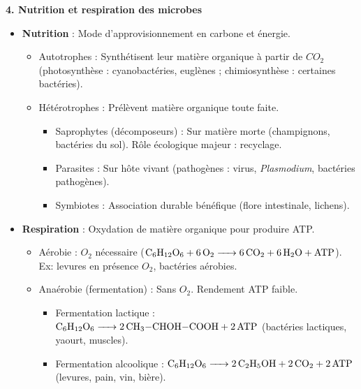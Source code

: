 \documentclass[11pt]{article}
\newcommand{\cle}[1]{{\popxbold\color{popdark}#1}}
\begin{document}
\begin{bilan}
\textbf{4. Nutrition et respiration des microbes}
\begin{itemize}
    \item \textbf{Nutrition} : Mode d'approvisionnement en carbone et énergie.
    \begin{itemize}
        \item \cle{Autotrophes} : Synthétisent leur matière organique à partir de $CO_2$ (photosynthèse : cyanobactéries, euglènes ; chimiosynthèse : certaines bactéries).
        \item \cle{Hétérotrophes} : Prélèvent matière organique toute faite.
        \begin{itemize}
            \item \cle{Saprophytes} (décomposeurs) : Sur matière morte (champignons, bactéries du sol). Rôle écologique majeur : recyclage.
            \item \cle{Parasites} : Sur hôte vivant (pathogènes : virus, \emph{Plasmodium}, bactéries pathogènes).
            \item \cle{Symbiotes} : Association durable bénéfique (flore intestinale, lichens).
        \end{itemize}
    \end{itemize}
    \item \textbf{Respiration} : Oxydation de matière organique pour produire ATP.
    \begin{itemize}
        \item \cle{Aérobie} : $O_2$ nécessaire ($\ce{C6H12O6 + 6O2 -> 6CO2 + 6H2O + ATP}$). Ex: levures en présence $O_2$, bactéries aérobies.
        \item \cle{Anaérobie} (fermentation) : Sans $O_2$. Rendement ATP faible.
        \begin{itemize}
            \item Fermentation lactique : $\ce{C6H12O6 -> 2 CH3-CHOH-COOH + 2 ATP}$ (bactéries lactiques, yaourt, muscles).
            \item Fermentation alcoolique : $\ce{C6H12O6 -> 2 C2H5OH + 2 CO2 + 2 ATP}$ (levures, pain, vin, bière).
        \end{itemize}
    \end{itemize}
\end{itemize}


\end{bilan}
\end{document}
